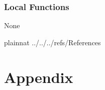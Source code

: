 \documentclass[12pt, titlepage]{article}
\begin{document}
\subsubsection{Local Functions}

None

\newpage

 {plainnat}
 {../../../refs/References}

\newpage

\section{Appendix} \label{Appendix}

\end{document}
